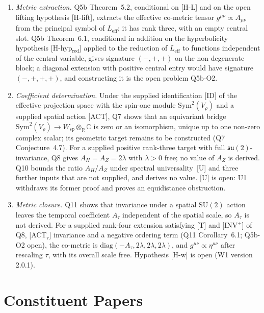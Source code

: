 \documentclass[11pt,a4paper]{article}
\theoremstyle{definition}
\newcommand{\SU}{\mathrm{SU}}
\newcommand{\su}{\mathfrak{su}}
\newcommand{\Leff}{L_{\mathrm{eff}}}
\newcommand{\geff}{g^{\mu\nu}}
\newcommand{\Atau}{A_\tau}
\newcommand{\AH}{A_H}
\newcommand{\AZ}{A_Z}
\newcommand{\Sym}{\mathrm{Sym}}
\begin{document}
\begin{enumerate}
      \item \textit{Metric extraction.}
      Q5b Theorem~5.2, conditional on [H-L] and on the open lifting hypothesis [H-lift],
      extracts the effective co-metric tensor $\geff \propto A_{\mu\nu}$ from the principal
      symbol of $\Leff$; it has rank three, with an empty central slot.
      Q5b Theorem~6.1, conditional in addition on the hyperbolicity hypothesis
      [H-hyp$_{\mathrm{red}}$] applied to the reduction of $\Leff$ to functions independent of the
      central variable, gives signature $(-,+,+)$ on the non-degenerate block; a diagonal
      extension with positive central entry would have signature $(-,+,+,+)$, and constructing
      it is the open problem Q5b-O2.

      \item \textit{Coefficient determination.}
      Under the supplied identification [ID] of the effective projection space with the
      spin-one module $\Sym^2(V_\rho)$ and a supplied spatial action [ACT], Q7 shows that an
      equivariant bridge $\Sym^2(V_\rho) \to W_{\mathrm{sp}} \otimes_\mathbb{R} \mathbb{C}$ is zero
      or an isomorphism, unique up to one non-zero complex scalar; its geometric target remains
      to be constructed (Q7 Conjecture~4.7).
      For a supplied positive rank-three target with full $\su(2)$-invariance, Q8 gives
      $\AH = \AZ = 2\lambda$ with $\lambda > 0$ free; no value of $\AZ$ is derived.
      Q10 bounds the ratio $\AH/\AZ$ under spectral universality~[U] and three further inputs
      that are not supplied, and derives no value.
      [U] is open: U1 withdraws its former proof and proves an equidistance obstruction.

      \item \textit{Metric closure.}
      Q11 shows that invariance under a spatial $\SU(2)$ action leaves the temporal
      coefficient $\Atau$ independent of the spatial scale, so $\Atau$ is not derived.
      For a supplied rank-four extension satisfying [T] and [INV$^+$] of Q8, [ACT$_\tau$] invariance and a negative ordering term
      (Q11 Corollary~6.1; Q5b-O2 open), the co-metric is
      $\mathrm{diag}(-\Atau, 2\lambda, 2\lambda, 2\lambda)$, and $\geff \propto \eta^{\mu\nu}$
      after rescaling $\tau$, with its overall scale free.
      Hypothesis [H-w] is open (W1 version 2.0.1).
    \end{enumerate}

  \section{Constituent Papers}
    \label{sec:papers}
\end{document}
